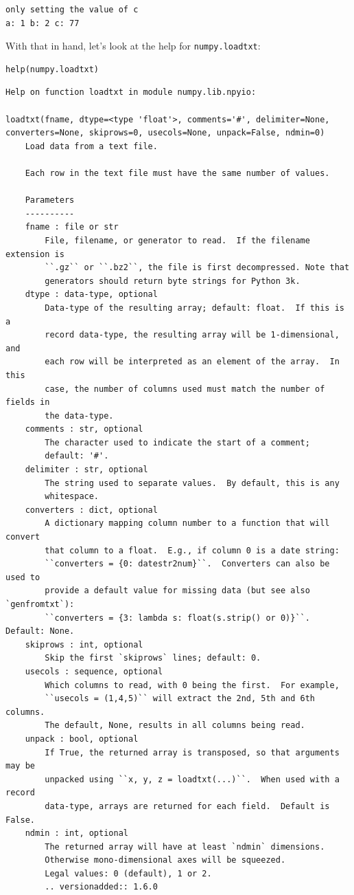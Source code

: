 \documentclass[]{book}
\begin{document}
\begin{verbatim}
only setting the value of c
a: 1 b: 2 c: 77
\end{verbatim}

With that in hand, let's look at the help for \texttt{numpy.loadtxt}:

\begin{verbatim}
help(numpy.loadtxt)
\end{verbatim}

\begin{verbatim}
Help on function loadtxt in module numpy.lib.npyio:

loadtxt(fname, dtype=<type 'float'>, comments='#', delimiter=None, converters=None, skiprows=0, usecols=None, unpack=False, ndmin=0)
    Load data from a text file.

    Each row in the text file must have the same number of values.

    Parameters
    ----------
    fname : file or str
        File, filename, or generator to read.  If the filename extension is
        ``.gz`` or ``.bz2``, the file is first decompressed. Note that
        generators should return byte strings for Python 3k.
    dtype : data-type, optional
        Data-type of the resulting array; default: float.  If this is a
        record data-type, the resulting array will be 1-dimensional, and
        each row will be interpreted as an element of the array.  In this
        case, the number of columns used must match the number of fields in
        the data-type.
    comments : str, optional
        The character used to indicate the start of a comment;
        default: '#'.
    delimiter : str, optional
        The string used to separate values.  By default, this is any
        whitespace.
    converters : dict, optional
        A dictionary mapping column number to a function that will convert
        that column to a float.  E.g., if column 0 is a date string:
        ``converters = {0: datestr2num}``.  Converters can also be used to
        provide a default value for missing data (but see also `genfromtxt`):
        ``converters = {3: lambda s: float(s.strip() or 0)}``.  Default: None.
    skiprows : int, optional
        Skip the first `skiprows` lines; default: 0.
    usecols : sequence, optional
        Which columns to read, with 0 being the first.  For example,
        ``usecols = (1,4,5)`` will extract the 2nd, 5th and 6th columns.
        The default, None, results in all columns being read.
    unpack : bool, optional
        If True, the returned array is transposed, so that arguments may be
        unpacked using ``x, y, z = loadtxt(...)``.  When used with a record
        data-type, arrays are returned for each field.  Default is False.
    ndmin : int, optional
        The returned array will have at least `ndmin` dimensions.
        Otherwise mono-dimensional axes will be squeezed.
        Legal values: 0 (default), 1 or 2.
        .. versionadded:: 1.6.0


\end{verbatim}
\end{document}
